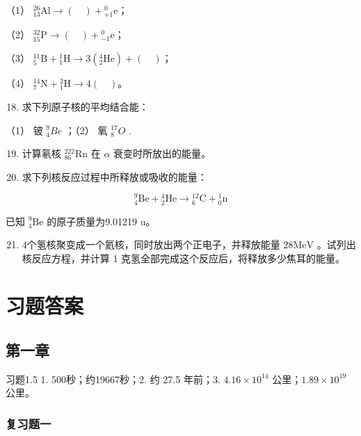 （1）
\({}^{26}_{13}\mathrm{Al}\longrightarrow(\quad)+{}^{0}_{+1}\mathrm{e}\)；

（2）
\({}^{32}_{15}\mathrm{P}\longrightarrow(\quad)+{}^{0}_{-1}\mathrm{e}\)；

（3）
\({}^{11}_{5}\mathrm{B}+{}^{1}_{1}\mathrm{H}\longrightarrow3({}^{4}_{2}\mathrm{He})+(\quad)\)；

（4）
\({}^{14}_{7}\mathrm{N}+{}^{2}_{1}\mathrm{H}\longrightarrow4(\quad)\)。

\begin{enumerate}
\setcounter{enumi}{17}
\item
  求下列原子核的平均结合能：
\end{enumerate}

（1） 铍 \({}^{9}_{4}Be\) ；（2） 氧 \({}^{17}_{8}O\) .

\begin{enumerate}
\setcounter{enumi}{18}
\item
  计算氡核 \({}^{222}_{86}\mathrm{Rn}\) 在 \(\alpha\)
  衰变时所放出的能量。
\item
  求下列核反应过程中所释放或吸收的能量：
\end{enumerate}

\[
{}^{9}_{4}\mathrm{Be}+{}^{4}_{2}\mathrm{He}\longrightarrow{}^{12}_{6}\mathrm{C}+{}^{1}_{0}\mathrm{n}
\]

已知 \({}^{9}_{4}\mathrm{Be}\) 的原子质量为9.01219 u。

\begin{enumerate}
\setcounter{enumi}{20}
\item
  4个氢核聚变成一个氦核，同时放出两个正电子，并释放能量
  \(28 \mathrm{MeV}\) 。试列出核反应方程，并计算 1
  克氢全部完成这个反应后，将释放多少焦耳的能量。
\end{enumerate}

\chapter{习题答案}

\section{第一章}

习题1.5 1. 500秒；约19667秒；2. 约 27.5 年前；3. \(4.16 \times 10^{14}\)
公里；\(1.89 \times 10^{19}\) 公里。

\subsection{复习题一}

